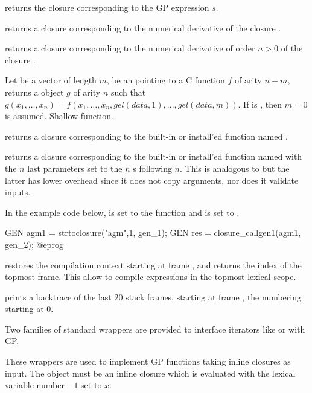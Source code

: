  returns the closure corresponding to the
GP expression $s$.

 returns a closure corresponding to the
numerical derivative of the closure .

 returns a closure corresponding to
the numerical derivative of order $n > 0$ of the closure .

Let  be a vector of length $m$,  be an 
pointing to a C function $f$ of arity $n+m$, returns a  object
$g$ of arity $n$ such that
$g(x_1,\ldots,x_n)=f(x_1,\ldots,x_n,gel(data,1),...,gel(data,m))$. If
 is , then $m=0$ is assumed. Shallow function.

 returns a closure corresponding to the
built-in or install'ed function named .

 returns a closure
corresponding to the built-in or install'ed function named  with the
$n$ last parameters set to the $n$ s following $n$. This is
analogous to  but the latter has
lower overhead since it does not copy arguments, nor does it validate inputs.

In the example code below,  is set to the function
 and  is set to .

\bprog
  GEN agm1 = strtoclosure("agm",1, gen_1);
  GEN res = closure_callgen1(agm1, gen_2);
@eprog

 restores the compilation context starting
at frame , and returns the index of the topmost frame. This allow to
compile expressions in the topmost lexical scope.

 prints a backtrace of the last $20$ stack
frames, starting at frame , the numbering starting at $0$.

Two families of standard wrappers are provided to interface iterators like
 or  with GP.

These wrappers are used to implement GP functions taking inline closures as
input. The object  must be an inline closure which is evaluated
with the lexical variable number $-1$ set to $x$.

